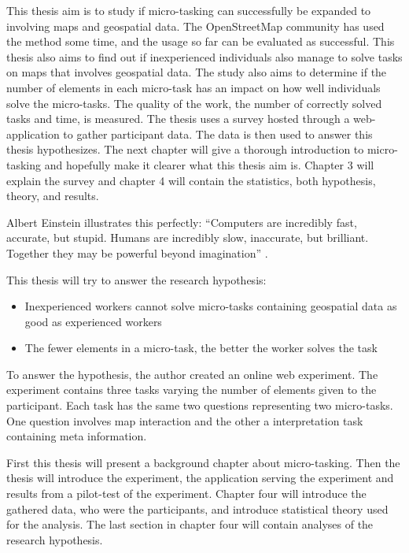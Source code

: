 This thesis aim is to study if micro-tasking can successfully be expanded to involving maps and geospatial data. The OpenStreetMap community has used the method some time, and the usage so far can be evaluated as successful. %
This thesis also aims to find out if inexperienced individuals also manage to solve tasks on maps that involves geospatial data. The study also aims to determine if the number of elements in each micro-task has an impact on how well individuals solve the micro-tasks. The quality of the work, the number of correctly solved tasks and time, is measured. The thesis uses a survey hosted through a web-application to gather participant data. The data is then used to answer this thesis hypothesizes. The next chapter will give a thorough introduction to micro-tasking and hopefully make it clearer what this thesis aim is. Chapter 3 will explain the survey and chapter 4 will contain the statistics, both hypothesis, theory, and results. 



Albert Einstein illustrates this perfectly: “Computers are incredibly fast, accurate, but stupid. Humans are incredibly slow, inaccurate, but brilliant. Together they may be powerful beyond imagination” \citep{Holzinger2013}. 

This thesis will try to answer the research hypothesis: 
\begin{itemize}
	\item Inexperienced workers cannot solve micro-tasks containing geospatial data as good as experienced workers
	\item The fewer elements in a micro-task, the better the worker solves the task
\end{itemize}

To answer the hypothesis, the author created an online web experiment. The experiment contains three tasks varying the number of elements given to the participant. Each task has the same two questions representing two micro-tasks. One question involves map interaction and the other a interpretation task containing meta information. 

 First this thesis will present a background chapter about micro-tasking.  Then the thesis will introduce the experiment, the application serving the experiment and results from a pilot-test of the experiment. Chapter four will introduce the gathered data, who were the participants, and introduce statistical theory used for the analysis. The last section in chapter four will contain analyses of the research hypothesis. 
